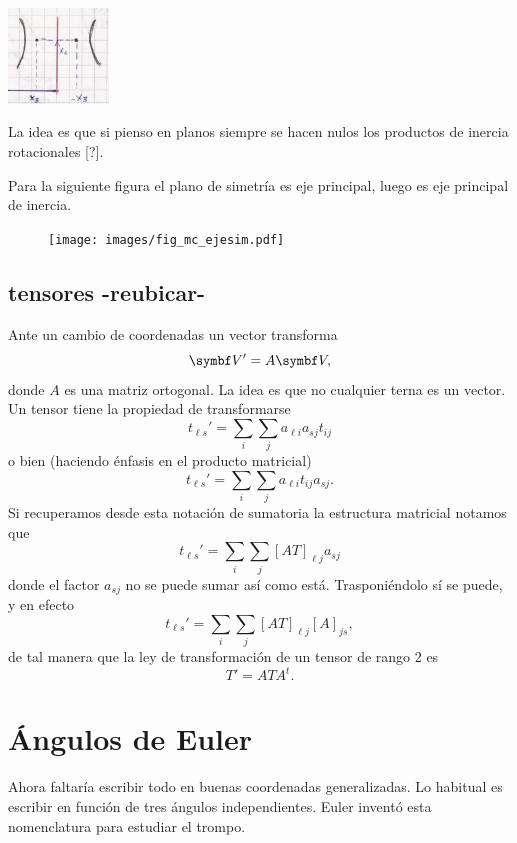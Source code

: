 \documentclass[10pt,oneside]{CBFT_book}
\begin{document}
\includegraphics[width=0.2\textwidth]{images/fig_mc_inercia_simetrias_6.jpg}

La idea es que si pienso en planos siempre se hacen nulos los productos de inercia rotacionales [?].

Para la siguiente figura el plano de simetría es eje principal, luego es eje principal de inercia.
\begin{figure}[!htb]
	\begin{center}
	\texttt{[image: images/fig\_mc\_ejesim.pdf]}
	\end{center}
	\caption{}
\end{figure} 

\subsection{tensores -reubicar-}

Ante un cambio de coordenadas un vector transforma 
\[
	\vb{V}' = A \vb{V},
\]
donde $A$ es una matriz ortogonal. La idea es que no cualquier terna es un vector.
Un tensor tiene la propiedad de transformarse
\[
	t_{\ell s}' = \sum_i \sum_j a_{\ell i} a_{sj} t_{ij}
\]
o bien (haciendo énfasis en el producto matricial)
\[
	t_{\ell s}' = \sum_i \sum_j a_{\ell i} t_{ij} a_{sj}.
\]
Si recuperamos desde esta notación de sumatoria la estructura matricial notamos que 
\[
	t_{\ell s}' = \sum_i \sum_j [AT]_{\ell j} a_{sj}
\]
donde el factor $a_{sj}$ no se puede sumar así como está. Trasponiéndolo sí se puede,
y en efecto
\[
	t_{\ell s}' = \sum_i \sum_j [AT]_{\ell j} [A]_{js},
\]
de tal manera que la ley de transformación de un tensor de rango 2 es
\[
	T'= ATA^t.
\]

\section{Ángulos de Euler}

Ahora faltaría escribir todo en buenas coordenadas generalizadas. Lo habitual es escribir en función
de tres ángulos independientes. Euler inventó esta nomenclatura para estudiar el trompo.
\end{document}
